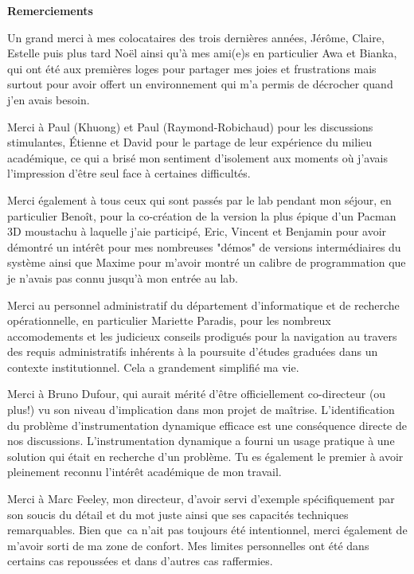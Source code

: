 \begin{center}
\textbf{\large Remerciements}
\end{center}

Un grand merci \`a mes colocataires des trois derni\`eres ann\'ees, J\'er\^ome,
Claire, Estelle puis plus tard No\"el ainsi qu'\`a mes ami(e)s en particulier
Awa et Bianka, qui ont \'et\'e aux premi\`eres loges pour partager mes joies et
frustrations mais surtout pour avoir offert un environnement qui m'a permis de
d\'ecrocher quand j'en avais besoin.

Merci \`a Paul (Khuong) et Paul (Raymond-Robichaud) pour les discussions
stimulantes, \'Etienne et David pour le partage de leur exp\'erience du milieu
acad\'emique, ce qui a bris\'e mon sentiment d'isolement aux moments o\`u j'avais
l'impression d'\^etre seul face \`a certaines difficult\'es.

Merci \'egalement \`a tous ceux qui sont pass\'es par le lab pendant mon s\'ejour, en
particulier Beno\^it, pour la co-cr\'eation de la version la plus \'epique d'un
Pacman 3D moustachu \`a laquelle j'aie particip\'e, Eric, Vincent et Benjamin pour
avoir d\'emontr\'e un int\'er\^et pour mes nombreuses "d\'emos" de versions interm\'ediaires
du syst\`eme ainsi que Maxime pour m'avoir montr\'e un calibre de programmation que
je n'avais pas connu jusqu'\`a mon entr\'ee au lab.

Merci au personnel administratif du d\'epartement d'informatique
et de recherche op\'erationnelle, en particulier Mariette Paradis, pour les
nombreux accomodements et les judicieux conseils prodigu\'es pour la navigation
au travers des requis administratifs inh\'erents \`a la poursuite d'\'etudes gradu\'ees
dans un contexte institutionnel. Cela a grandement simplifi\'e ma vie.

Merci \`a Bruno Dufour, qui aurait m\'erit\'e d'\^etre officiellement co-directeur (ou
plus!) vu son niveau d'implication dans mon projet de ma\^itrise.
L'identification du probl\`eme d'instrumentation dynamique efficace est une
cons\'equence directe de nos discussions. L'instrumentation dynamique a fourni un
usage pratique \`a une solution qui \'etait en recherche d'un probl\`eme. Tu es
\'egalement le premier \`a avoir pleinement reconnu l'int\'er\^et acad\'emique de mon
travail.

Merci \`a Marc Feeley, mon directeur, d'avoir servi d'exemple sp\'ecifiquement
par son soucis du d\'etail et du mot juste ainsi que ses capacit\'es techniques
remarquables.  Bien que \,ca n'ait pas toujours \'et\'e intentionnel, merci
\'egalement de m'avoir sorti de ma zone de confort. Mes limites personnelles
ont \'et\'e dans certains cas repouss\'ees et dans d'autres cas raffermies. 
